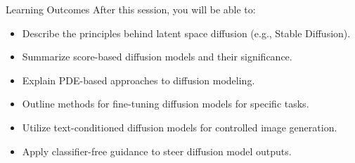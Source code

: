 \begin{frame}{Learning Outcomes}
After this session, you will be able to:
\begin{itemize}
    \item Describe the principles behind latent space diffusion (e.g., Stable Diffusion).
    \item Summarize score-based diffusion models and their significance.
    \item Explain PDE-based approaches to diffusion modeling.
    \item Outline methods for fine-tuning diffusion models for specific tasks.
    \item Utilize text-conditioned diffusion models for controlled image generation.
    \item Apply classifier-free guidance to steer diffusion model outputs.
\end{itemize}
\end{frame}
